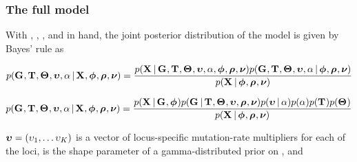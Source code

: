 \begin{frame}[t]
    \frametitle{The full model}
    With \alignmentVector, \hkyModelVector, \ploidyScalarVector, and
    \mutationRateScalarConstantVector in hand, the joint posterior distribution
    of the model is given by Bayes' rule as
    \begin{displaybox}
        \footnotesize
        \[
            p(\geneTreeVector, \divTimeMapVector, \demographicParamVector, 
            \locusMutationRateScalarVector, \locusRateHetShapeParameter \given
            \alignmentVector, \hkyModelVector, \ploidyScalarVector,
            \mutationRateScalarConstantVector) =
            \frac{p(\alignmentVector \given \geneTreeVector, \divTimeMapVector,
                \demographicParamVector, \locusMutationRateScalarVector,
                \locusRateHetShapeParameter, \hkyModelVector, \ploidyScalarVector,
                \mutationRateScalarConstantVector)
                p(\geneTreeVector, \divTimeMapVector, \demographicParamVector,
                \locusMutationRateScalarVector, \locusRateHetShapeParameter \given
                \hkyModelVector, \ploidyScalarVector,
                \mutationRateScalarConstantVector)}{
                p(\alignmentVector \given \hkyModelVector, \ploidyScalarVector,
                \mutationRateScalarConstantVector)}
        \]\vspace{0mm}
    \end{displaybox}
    \begin{displaybox}
        \footnotesize
        \[
            p(\geneTreeVector, \divTimeMapVector, \demographicParamVector, 
            \locusMutationRateScalarVector, \locusRateHetShapeParameter \given
            \alignmentVector, \hkyModelVector, \ploidyScalarVector,
            \mutationRateScalarConstantVector) =
            \frac{p(\alignmentVector \given \geneTreeVector, \hkyModelVector)
                p(\geneTreeVector \given \divTimeMapVector, \demographicParamVector,
                \locusMutationRateScalarVector, \ploidyScalarVector,
                \mutationRateScalarConstantVector)
                p(\locusMutationRateScalarVector \given \locusRateHetShapeParameter)
                p(\locusRateHetShapeParameter)
                p(\divTimeMapVector)
                p(\demographicParamVector)}{
                p(\alignmentVector \given \hkyModelVector, \ploidyScalarVector,
                \mutationRateScalarConstantVector)}
        \]\vspace{0mm}
    \end{displaybox}
$\boldsymbol{\upsilon} = (\upsilon_{1}, \ldots
\upsilon_{K})$
is a vector of locus-specific mutation-rate multipliers for each of the
\nlociTotal loci,
\locusRateHetShapeParameter is the shape parameter of a gamma-distributed
prior on \locusMutationRateScalar{}, and
\end{frame}


